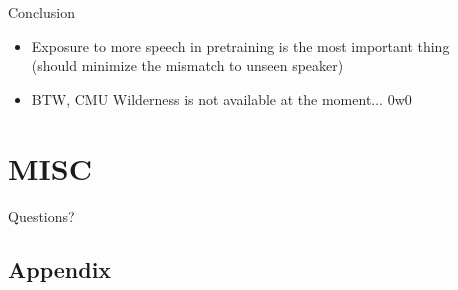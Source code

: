 \documentclass{beamer}
\newcommand{\weib}{\CJKfamily{weib}}
\begin{document}
\begin{frame}{Conclusion}
  \begin{itemize}
    \item Exposure to more speech in pretraining is the most important thing\\
      (should minimize the mismatch to unseen speaker)

      \item BTW, CMU Wilderness is not available at the moment... 0w0
  \end{itemize}
\end{frame}


\section{MISC}
\begin{frame}
	\begin{center}
    \LARGE{Questions?}
	\end{center}
\end{frame}


\subsection{Appendix}
\end{document}
